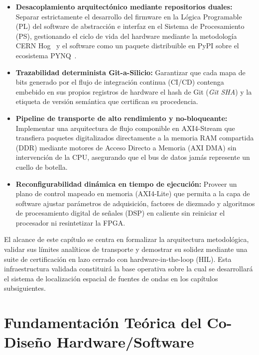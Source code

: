 \documentclass[standalone]{subfiles}
\begin{document}
\begin{itemize}
    \item \textbf{Desacoplamiento arquitectónico mediante repositorios duales:} Separar estrictamente el desarrollo del firmware en la Lógica Programable (PL) del software de abstracción e interfaz en el Sistema de Procesamiento (PS), gestionando el ciclo de vida del hardware mediante la metodología CERN Hog~\cite{cern_hog} y el software como un paquete distribuible en PyPI sobre el ecosistema PYNQ~\cite{pynq_framework}.
    
    \item \textbf{Trazabilidad determinista Git-a-Silicio:} Garantizar que cada mapa de bits generado por el flujo de integración continua (CI/CD) contenga embebido en sus propios registros de hardware el hash de Git (\textit{Git SHA}) y la etiqueta de versión semántica que certifican su procedencia.
    
    \item \textbf{Pipeline de transporte de alto rendimiento y no-bloqueante:} Implementar una arquitectura de flujo componible en AXI4-Stream que transfiera paquetes digitalizados directamente a la memoria RAM compartida (DDR) mediante motores de Acceso Directo a Memoria (AXI DMA) sin intervención de la CPU, asegurando que el bus de datos jamás represente un cuello de botella.
    
    \item \textbf{Reconfigurabilidad dinámica en tiempo de ejecución:} Proveer un plano de control mapeado en memoria (AXI4-Lite) que permita a la capa de software ajustar parámetros de adquisición, factores de diezmado y algoritmos de procesamiento digital de señales (DSP) en caliente sin reiniciar el procesador ni resintetizar la FPGA.
\end{itemize}

El alcance de este capítulo se centra en formalizar la arquitectura metodológica, validar sus límites analíticos de transporte y demostrar su solidez mediante una suite de certificación en lazo cerrado con hardware-in-the-loop (HIL). Esta infraestructura validada constituirá la base operativa sobre la cual se desarrollará el sistema de localización espacial de fuentes de ondas en los capítulos subsiguientes.

\section{Fundamentación Teórica del Co-Diseño Hardware/Software}
\label{sec:marco_teorico_framework}
\end{document}
